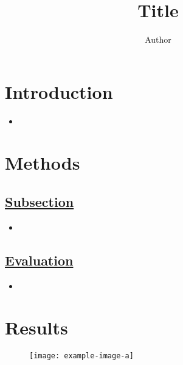 \documentclass[portrait,color=UCLburgundy,margin=2cm]{uclposter}
\begin{document}
\title{Title}

\author[1 *]{Author}


\maketitle

\begin{multicols}{2}
\normalsize

\section*{Introduction}
    \begin{highlightbox}[UCLlightgreen]
        \begin{itemize}
            \item \blindtext
        \end{itemize}
    \end{highlightbox}

\section*{Methods}
    \subsection*{\underline{\textbf{Subsection}}}
        \begin{itemize}
            \item \blindtext
        \end{itemize}
    
    \subsection*{\underline{\textbf{Evaluation}}}
        \begin{highlightbox}[UCLlightgreen]
            \begin{itemize}
                \item \blindtext
            \end{itemize}
        \end{highlightbox}

\section*{Results}
    \begin{figure}[H]
        \centering
        \texttt{[image: example-image-a]}
        \begin{highlightbox}[UCLlightblue]
            \captionsetup{singlelinecheck=false, justification=centering}
            \caption{\blindtext}
        \end{highlightbox}
        \label{fig:com_graph}
    \end{figure}


\end{multicols}
\end{document}
